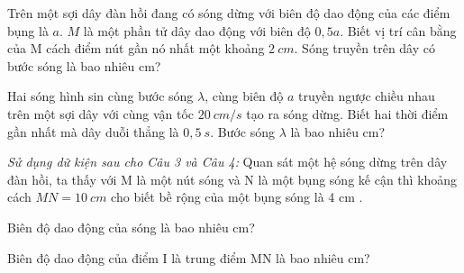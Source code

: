 \setcounter{ex}{0}
\PhanIII
\begin{ex}
Trên một sợi dây đàn hồi đang có sóng dừng với biên độ dao động của các điểm bụng là $a$. $M$ là một phần tử dây dao động với biên độ $0,5a$. Biết vị trí cân bằng của M cách điểm nút gần nó nhất một khoảng $2\ cm$. Sóng truyền trên dây có bước sóng là bao nhiêu cm?
\loigiai{}
\end{ex}
\begin{ex}
Hai sóng hình sin cùng bước sóng $\lambda$, cùng biên độ $a$ truyền ngược chiều nhau trên một sợi dây với cùng vận tốc $20\ cm/s$ tạo ra sóng dừng. Biết hai thời điểm gần nhất mà dây duỗi thẳng là $0,5\ s$. Bước sóng $\lambda$ là bao nhiêu cm?
\end{ex}
\textit{Sử dụng dữ kiện sau cho Câu 3 và Câu 4:} Quan sát một hệ sóng dừng trên dây đàn hồi, ta thấy với M là một nút sóng và N là một bụng sóng kế cận thì khoảng cách $MN = 10\ cm$ cho biết bề rộng của một bụng sóng là 4 cm . 
\begin{ex}
Biên độ dao động của sóng là bao nhiêu cm?
\end{ex}
\begin{ex}
Biên độ dao động của điểm I là trung điểm MN là bao nhiêu cm?
\end{ex}
